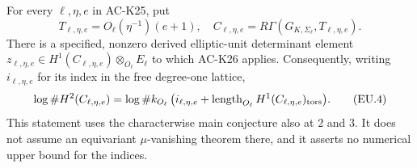 \begin{proposition}
\label{AC-K26-elliptic}
For every $\ell,\eta,e$ in AC-K25, put
\[
       T_{\ell,\eta,e}=O_\ell(\eta^{-1})(e+1),
       \quad
       C_{\ell,\eta,e}=
                 R\Gamma(G_{K,\Sigma_\ell},T_{\ell,\eta,e}).
\]
There is a specified, nonzero derived elliptic-unit
determinant element
$z_{\ell,\eta,e}\in H^1(C_{\ell,\eta,e})\otimes_{O_\ell}E_\ell$
to which AC-K26 applies.  Consequently, writing
$i_{\ell,\eta,e}$ for its index in the free
degree-one lattice,
\[
 \log\#H^2(C_{\ell,\eta,e})
  =\log\#k_{O_\ell}\,
       \bigl(i_{\ell,\eta,e}+
          \operatorname{length}_{O_\ell}H^1(C_{\ell,\eta,e})_{\rm tors}\bigr).
                                                            \tag{EU.4}
\]
This statement uses the characterwise main conjecture
also at $2$ and $3$.  It does not assume an equivariant
$\mu$-vanishing theorem there, and it asserts no
numerical upper bound for the indices.
\end{proposition}
